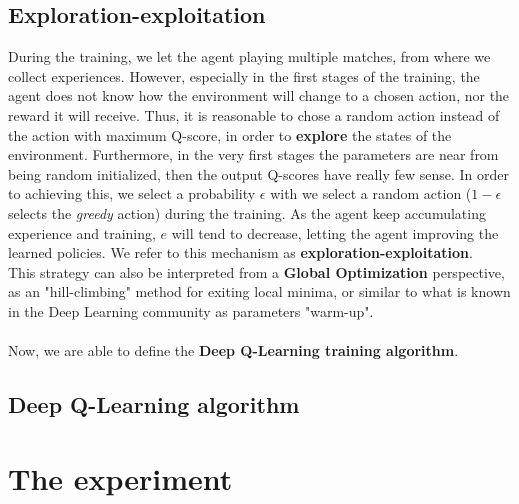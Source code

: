 \documentclass{article}
\begin{document}
\subsection{Exploration-exploitation}
During the training, we let the agent playing multiple matches, from where we collect experiences. However, especially in the first stages of the training, the agent does not know how the environment will change to a chosen action, nor the reward it will receive. Thus, it is reasonable to chose a random action instead of the action with maximum Q-score, in order to \textbf{explore} the states of the environment. Furthermore, in the very first stages the parameters are near from being random initialized, then the output Q-scores have really few sense. In order to achieving this, we select a probability $\epsilon$ with we select a random action ($1 - \epsilon$ selects the \textit{greedy} action) during the training. As the agent keep accumulating experience and training, $e$ will tend to decrease, letting the agent improving the learned policies. We refer to this mechanism as \textbf{exploration-exploitation}.\\
This strategy can also be interpreted from a \textbf{Global Optimization} perspective, as an "hill-climbing" method for exiting local minima, or similar to what is known in the Deep Learning community as parameters "warm-up".
\\
\\
Now, we are able to define the \textbf{Deep Q-Learning training algorithm}.
\subsection{Deep Q-Learning algorithm}


\section{The experiment}
\end{document}
